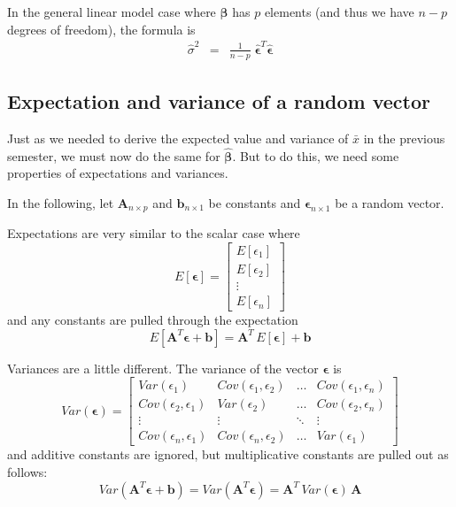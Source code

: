 \documentclass[]{book}
\theoremstyle{definition}
\theoremstyle{definition}
\theoremstyle{remark}
\begin{document}
In the general linear model case where \(\boldsymbol{\beta}\) has \(p\)
elements (and thus we have \(n-p\) degrees of freedom), the formula is
\[\begin{eqnarray*}
\hat{\sigma}^{2} & = & \frac{1}{n-p}\;\hat{\boldsymbol{\epsilon}}^{T}\hat{\boldsymbol{\epsilon}}
\end{eqnarray*}\]

\subsection{Expectation and variance of a random
vector}\label{expectation-and-variance-of-a-random-vector}

Just as we needed to derive the expected value and variance of
\(\bar{x}\) in the previous semester, we must now do the same for
\(\hat{\boldsymbol{\beta}}\). But to do this, we need some properties of
expectations and variances.

In the following, let \(\boldsymbol{A}_{n\times p}\) and
\(\boldsymbol{b}_{n\times1}\) be constants and
\(\boldsymbol{\epsilon}_{n\times1}\) be a random vector.

Expectations are very similar to the scalar case where \[
E\left[\boldsymbol{\epsilon}\right]=\left[\begin{array}{c}
E\left[\epsilon_{1}\right]\\
E\left[\epsilon_{2}\right]\\
\vdots\\
E\left[\epsilon_{n}\right]
\end{array}\right]
\] and any constants are pulled through the expectation \[
E\left[\boldsymbol{A}^{T}\boldsymbol{\epsilon}+\boldsymbol{b}\right]=\boldsymbol{A}^{T}\,E\left[\boldsymbol{\epsilon}\right]+\boldsymbol{b}
\]

Variances are a little different. The variance of the vector
\(\boldsymbol{\epsilon}\) is \[
Var\left(\boldsymbol{\epsilon}\right)=\left[\begin{array}{cccc}
Var\left(\epsilon_{1}\right) & Cov\left(\epsilon_{1},\epsilon_{2}\right) & \dots & Cov\left(\epsilon_{1},\epsilon_{n}\right)\\
Cov\left(\epsilon_{2},\epsilon_{1}\right) & Var\left(\epsilon_{2}\right) & \dots & Cov\left(\epsilon_{2},\epsilon_{n}\right)\\
\vdots & \vdots & \ddots & \vdots\\
Cov\left(\epsilon_{n},\epsilon_{1}\right) & Cov\left(\epsilon_{n},\epsilon_{2}\right) & \dots & Var\left(\epsilon_{1}\right)
\end{array}\right]
\] and additive constants are ignored, but multiplicative constants are
pulled out as follows: \[
Var\left(\boldsymbol{A}^{T}\boldsymbol{\epsilon}+\boldsymbol{b}\right)=Var\left(\boldsymbol{A}^{T}\boldsymbol{\epsilon}\right)=\boldsymbol{A}^{T}\,Var\left(\boldsymbol{\epsilon}\right)\,\boldsymbol{A}
\]
\end{document}
